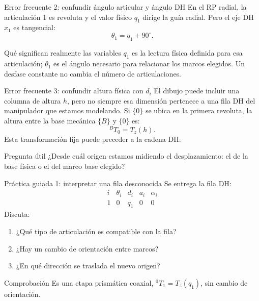 \documentclass[aspectratio=169,11pt]{beamer}
\begin{document}
\begin{frame}[t]{Error frecuente 2: confundir ángulo articular y ángulo DH}
 \small
 En el RP radial, la articulación 1 es revoluta
 y el valor físico $q_1$ dirige la guía radial.
 Pero el eje DH $x_1$ es tangencial:
 \[
 \boxed{\theta_1=q_1+90^\circ.}
 \]
 \pause
 \begin{alertblock}{Qué significan realmente las variables}
 $q_1$ es la lectura física definida para esa articulación;
 $\theta_1$ es el ángulo necesario para relacionar los marcos
 elegidos. Un desfase constante no cambia el número de articulaciones.
 \end{alertblock}
\end{frame}

\begin{frame}[t]{Error frecuente 3: confundir altura física con $d_i$}
 \small
 El dibujo puede incluir una columna de altura $h$,
 pero no siempre esa dimensión pertenece a una fila DH
 del manipulador que estamos modelando.
 \pause
 Si $\{0\}$ se ubica en la primera revoluta,
 la altura entre la base mecánica $\{B\}$ y $\{0\}$ es:
 \[
 \boxed{{}^{B}T_0=T_z(h).}
 \]
 \small Esta transformación fija puede preceder a la cadena DH.
 \begin{block}{Pregunta útil}
 ¿Desde cuál origen estamos midiendo el desplazamiento:
 el de la base física o el del marco base elegido?
 \end{block}
\end{frame}

\begin{frame}[t]{Práctica guiada 1: interpretar una fila desconocida}
 \small
 Se entrega la fila DH:
 \[
 \begin{array}{c|cccc}
 i & \theta_i & d_i & a_i & \alpha_i\\\hline
 1 & 0 & q_1 & 0 & 0
 \end{array}
 \]
 \pause
 Discuta:
 \begin{enumerate}
  \item ¿Qué tipo de articulación es compatible con la fila?
  \item ¿Hay un cambio de orientación entre marcos?
  \item ¿En qué dirección se traslada el nuevo origen?
 \end{enumerate}
 \pause
 \begin{block}{Comprobación}
 Es una etapa prismática coaxial, ${}^0T_1=T_z(q_1)$,
 sin cambio de orientación.
 \end{block}
\end{frame}
\end{document}
